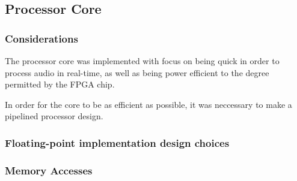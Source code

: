 \FloatBarrier
\subsection{Processor Core}\label{section:fpga-processor-core}

\subsubsection{Considerations}

The processor core was implemented with focus on being quick
in order to process audio in real-time, as well as being power
efficient to the degree permitted by the FPGA chip.

In order for the core to be as efficient as possible, it was
neccessary to make a pipelined processor design.

\subsubsection{Floating-point implementation design choices}

\subsubsection{Memory Accesses}


